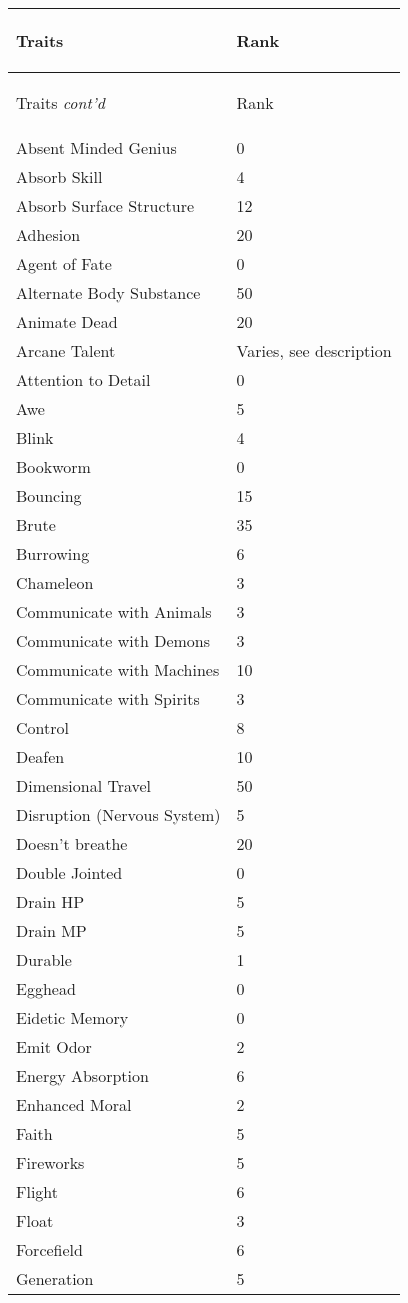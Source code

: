 \documentclass[twoside]{book}
\begin{document}
\begin{longtable}{p{1.25in}l} 
  Traits& \begin{turn}{70}{Rank}\end{turn}
          \\
  \hline
  \hline
  \endfirsthead
  Traits \textit{cont'd}
        & \begin{turn}{70}{Rank}\end{turn}
           \\
  \hline
  \endhead
\raggedright  Absent Minded Genius& 0\tabularnewline
      \raggedright  Absorb Skill& 4\tabularnewline
      \raggedright  Absorb Surface Structure& 12\tabularnewline
      \raggedright  Adhesion& 20\tabularnewline
      \raggedright  Agent of Fate& 0\tabularnewline
      \raggedright  Alternate Body Substance& 50\tabularnewline
      \raggedright  Animate Dead& 20\tabularnewline
      \raggedright  Arcane Talent& Varies, see
           description\tabularnewline
      \raggedright  Attention to Detail& 0\tabularnewline
      \raggedright  Awe& 5\tabularnewline
      \raggedright  Blink& 4\tabularnewline
      \raggedright  Bookworm& 0\tabularnewline
      \raggedright  Bouncing& 15\tabularnewline
      \raggedright  Brute& 35\tabularnewline
      \raggedright  Burrowing& 6\tabularnewline
      \raggedright  Chameleon& 3\tabularnewline
      \raggedright  Communicate with Animals& 3\tabularnewline
      \raggedright  Communicate with Demons& 3\tabularnewline
      \raggedright  Communicate with Machines& 10\tabularnewline
      \raggedright  Communicate with Spirits& 3\tabularnewline
      \raggedright  Control& 8\tabularnewline
      \raggedright  Deafen& 10\tabularnewline
      \raggedright  Dimensional Travel& 50\tabularnewline
      \raggedright  Disruption (Nervous System)& 5\tabularnewline
      \raggedright  Doesn't breathe& 20\tabularnewline
      \raggedright  Double Jointed& 0\tabularnewline
      \raggedright  Drain HP& 5\tabularnewline
      \raggedright  Drain MP& 5\tabularnewline
      \raggedright  Durable& 1\tabularnewline
      \raggedright  Egghead& 0\tabularnewline
      \raggedright  Eidetic Memory& 0\tabularnewline
      \raggedright  Emit Odor& 2\tabularnewline
      \raggedright  Energy Absorption& 6\tabularnewline
      \raggedright  Enhanced Moral& 2\tabularnewline
      \raggedright  Faith& 5\tabularnewline
      \raggedright  Fireworks& 5\tabularnewline
      \raggedright  Flight& 6\tabularnewline
      \raggedright  Float& 3\tabularnewline
      \raggedright  Forcefield& 6\tabularnewline
      \raggedright  Generation& 5\tabularnewline

\end{longtable}
\end{document}
